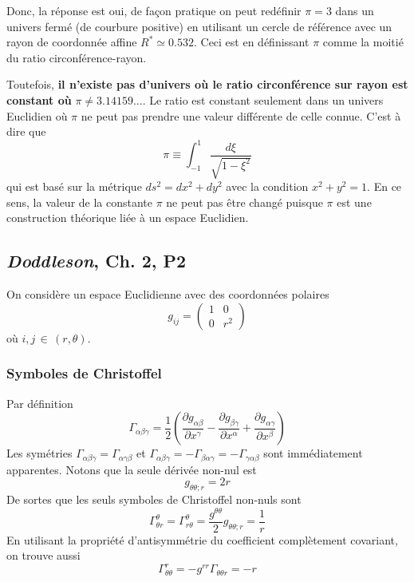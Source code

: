 \documentclass{article}
\numberwithin{equation}{section}
\begin{document}
Donc, la réponse est oui, de façon pratique on peut redéfinir $\pi = 3$ dans un 
univers fermé (de courbure positive) en utilisant un cercle de référence avec un rayon 
de coordonnée affine $R^{*} \simeq 0.532$. Ceci est en définissant $\pi$ comme la moitié 
du ratio circonférence-rayon.

Toutefois, \textbf{il n'existe pas d'univers où le ratio circonférence sur rayon est constant 
où} $\pi \not= 3.14159...$. Le ratio est constant seulement dans un univers Euclidien où 
$\pi$ ne peut pas prendre une valeur différente de celle connue. C'est à dire que 
\[
        \pi \equiv \int_{-1}^1 \frac{d\xi}{\sqrt{1 - \xi^2}}
\]
qui est basé sur la métrique $ds^2 = dx^2 + dy^2$ 
avec la condition $x^2 + y^2 = 1$. En ce sens, la valeur de la constante $\pi$ ne peut pas être 
changé puisque $\pi$ est une construction théorique liée à un espace Euclidien.


\subsection{\textit{Doddleson}, Ch. 2, P2}
On considère un espace Euclidienne avec des coordonnées polaires
\[
        g_{ij} =  
        \left( 
\begin{matrix}
        1 & 0 \\ 
        0 & r^2
\end{matrix}
        \right)
\]
où $i,j\, \in \, (r, \theta)$.
\subsubsection{Symboles de Christoffel}
Par définition
\[
        \Gamma_{\alpha \beta \gamma} = \frac{1}{2} \left( 
                \frac{\partial g_{\alpha \beta}}{\partial x^{\gamma}}
                - \frac{\partial g_{\beta \gamma}}{\partial x^{\alpha}}
                + \frac{\partial g_{\alpha \gamma}}{\partial x^{\beta}}
        \right)
\]
Les symétries $\Gamma_{\alpha \beta \gamma} = \Gamma_{\alpha \gamma \beta}$ et 
$\Gamma_{\alpha \beta \gamma} = - \Gamma_{\beta \alpha \gamma} = - \Gamma_{\gamma \alpha \beta}$ 
sont immédiatement apparentes. Notons que la seule dérivée non-nul est 
\[
        g_{\theta \theta ;r} = 2r
\]
De sortes que les seuls symboles de Christoffel non-nuls sont
\[
       \boxed{\Gamma^{\theta}_{\theta r} =  \Gamma^{\theta}_{r \theta} = 
       \frac{g^{\theta \theta}}{2} g_{\theta \theta ;r} = \frac{1}{r}}
\]
En utilisant la propriété d'antisymmétrie du coefficient complètement covariant, on trouve aussi
\[
        \boxed{\Gamma^{r}_{\theta \theta} = -g^{rr}\Gamma_{\theta \theta r} = -r}
\]
\end{document}
